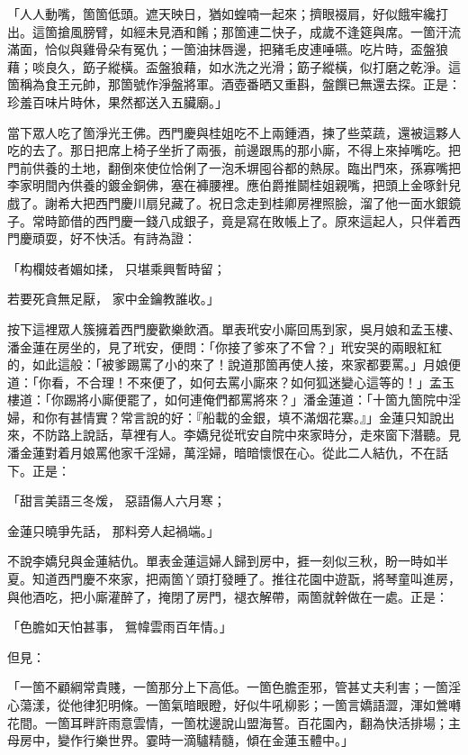 \begin{showcontents}{}
「人人動嘴，箇箇低頭。遮天映日，猶如蝗喃一起來；擠眼裰肩，好似餓牢纔打出。這箇搶風膀臂，如經未見酒和餚；那箇連二快子，成歲不逢筵與席。一箇汗流滿面，恰似與雞骨朵有冤仇；一箇油抹唇邊，把豬毛皮連唾嚥。吃片時，盃盤狼藉；啖良久，筯子縱橫。盃盤狼藉，如水洗之光滑；筯子縱橫，似打磨之乾淨。這箇稱為食王元帥，那箇號作淨盤將軍。酒壺番晒又重斟，盤饌已無還去探。正是：珍羞百味片時休，果然都送入五臟廟。」

當下眾人吃了箇淨光王佛。西門慶與桂姐吃不上兩鍾酒，揀了些菜蔬，還被這夥人吃的去了。那日把席上椅子坐折了兩張，前邊跟馬的那小廝，不得上來掉嘴吃。把門前供養的土地，翻倒來使位恰俐了一泡禾塀囤谷都的熱尿。臨出門來，孫寡嘴把李家明間內供養的鍍金銅佛，塞在褲腰裡。應伯爵推鬬桂姐親嘴，把頭上金啄針兒戲了。謝希大把西門慶川扇兒藏了。祝日念走到桂卿房裡照臉，溜了他一面水銀鏡子。常時節借的西門慶一錢八成銀子，竟是寫在敗帳上了。原來這起人，只伴着西門慶頑耍，好不快活。有詩為證：

「构欄妓者媚如揉，  只堪乘興暫時留；

若要死貪無足厭，  家中金鑰教誰收。」

按下這裡眾人簇擁着西門慶歡樂飲酒。單表玳安小廝回馬到家，吳月娘和孟玉樓、潘金蓮在房坐的，見了玳安，便問：「你接了爹來了不曾？」玳安哭的兩眼紅紅的，如此這般：「被爹踢罵了小的來了！說道那箇再使人接，來家都要罵。」月娘便道：「你看，不合理！不來便了，如何去罵小廝來？如何狐迷變心這等的！」孟玉樓道：「你踢將小廝便罷了，如何連俺們都罵將來？」潘金蓮道：「十箇九箇院中淫婦，和你有甚情實？常言說的好：『船載的金銀，填不滿烟花寨。』」金蓮只知說出來，不防路上說話，草裡有人。李嬌兒從玳安自院中來家時分，走來窗下潛聽。見潘金蓮對着月娘罵他家千淫婦，萬淫婦，暗暗懷恨在心。從此二人結仇，不在話下。正是：

「甜言美語三冬煖，  惡語傷人六月寒；

金蓮只曉爭先話，  那料旁人起禍端。」

不說李嬌兒與金蓮結仇。單表金蓮這婦人歸到房中，捱一刻似三秋，盼一時如半夏。知道西門慶不來家，把兩箇丫頭打發睡了。推往花園中遊翫，將琴童叫進房，與他酒吃，把小廝灌醉了，掩閉了房門，褪衣解帶，兩箇就幹做在一處。正是：

「色膽如天怕甚事，  鴛幃雲雨百年情。」

但見：

「一箇不顧綱常貴賤，一箇那分上下高低。一箇色膽歪邪，管甚丈夫利害；一箇淫心蕩漾，從他律犯明條。一箇氣暗眼瞪，好似牛吼柳影；一箇言嬌語澀，渾如鶯囀花間。一箇耳畔許雨意雲情，一箇枕邊說山盟海誓。百花園內，翻為快活排場；主母房中，變作行樂世界。霎時一滴驢精髓，傾在金蓮玉體中。」


\end{showcontents}
